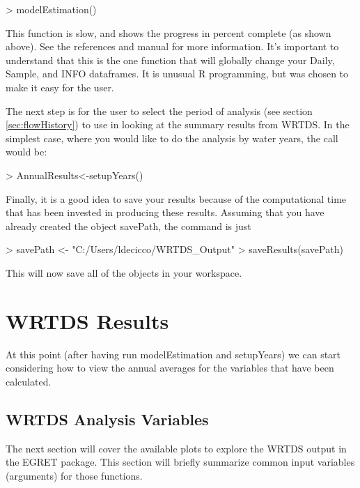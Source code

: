\documentclass[a4paper,11pt]{article}
\begin{document}
\begin{Schunk}
\begin{Sinput}
> modelEstimation()
\end{Sinput}
\end{Schunk}

This function is slow, and shows the progress in percent complete (as shown above). See the references and manual for more information. It's important to understand that this is the one function that will globally change your Daily, Sample, and INFO dataframes. It is unusual R programming, but was chosen to make it easy for the user.

The next step is for the user to select the period of analysis (see section \ref{sec:flowHistory}) to use in looking at the summary results from WRTDS. In the simplest case, where you would like to do the analysis by water years, the call would be:

\begin{Schunk}
\begin{Sinput}
> AnnualResults<-setupYears()
\end{Sinput}
\end{Schunk}

Finally, it is a good idea to save your results because of the computational time that has been invested in producing these results. Assuming that you have already created the object savePath, the command is just 

\begin{Schunk}
\begin{Sinput}
> savePath <- "C:/Users/ldecicco/WRTDS_Output"
> saveResults(savePath) 
\end{Sinput}
\end{Schunk}

This will now save all of the objects in your workspace.  

\section{WRTDS Results}
\label{sec:wrtdsResults}
At this point (after having run modelEstimation and setupYears) we can start considering how to view the annual averages for the variables that have been calculated.  

\subsection{WRTDS Analysis Variables}
\label{sec:wqVariables}
The next section will cover the available plots to explore the WRTDS output in the EGRET package. This section will briefly summarize common input variables (arguments) for those functions.
\end{document}
